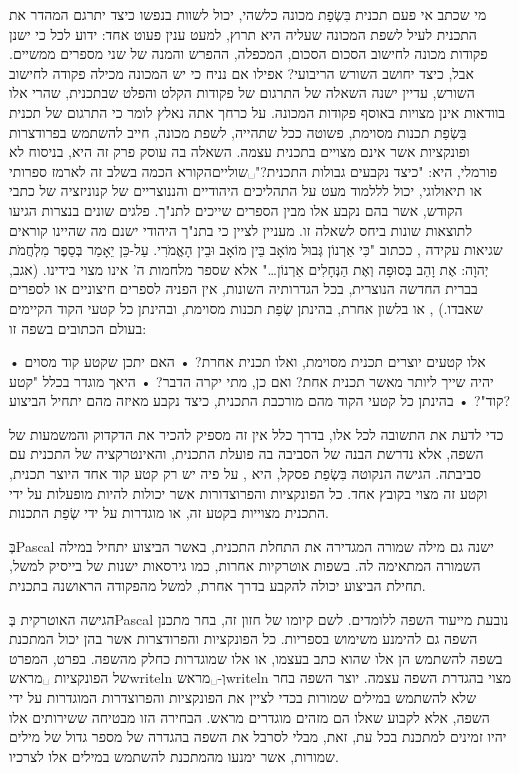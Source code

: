 מי שכתב אי פעם תכנית בִּשְׂפַת מכונה כלשהי, יכול לשוות בנפשו כיצד יתרגם המהדר את התכנית לעיל לשפת המכונה שעליה היא תרוץ, למעט ענין פעוט אחד: ידוע לכל כי ישנן פקודות מכונה לחישוב הסכום הסכום, המכפלה, ההפרש והמנה של שני מספרים ממשיים. אבל, כיצד יחושב השורש הריבועי? אפילו אם נניח כי יש המכונה מכילה פקודה לחישוב השורש, עדיין ישנה השאלה של התרגום של פקודות הקלט והפלט שבתכנית, שהרי אלו בוודאות אינן מצויות באוסף פקודות המכונה.
על כרחך אתה נאלץ לומר כי התרגום של תכנית בִּשְׂפַת תכנות מסוימת, פשוטה ככל שתהייה, לשפת מכונה, חייב להשתמש בפרודצרות ופונקציות אשר אינם מצויים בתכנית עצמה. השאלה בה עוסק פרק זה היא, בניסוח לא פורמלי, היא: "כיצד נקבעים גבולות התכנית?"␣שוליים{הקורא הכמה בשלב זה לארמז ספרותי או תיאולוגי, יכול לללמוד מעט על התהליכים היהודיים והננוצריים של קנוניזציה של כתבי הקודש, אשר בהם נקבע אלו מבין הספרים שייכים לתנ"ך. פלגים שונים בנצרות הגיעו לתוצאות שונות ביחס לשאלה זו. מעניין לציין כי בתנ"ך היהודי ישנם מה שהיינו קוראים שגיאות עקידה , ככתוב "כִּי אַרְנוֹן גְּבוּל מוֹאָב בֵּין מוֹאָב וּבֵין הָאֱמֹרִי. עַל-כֵּן יֵאָמַר בְּסֵפֶר מִלְחֲמֹת יְהוָה: אֶת וָהֵב בְּסוּפָה וְאֶת הַנְּחָלִים אַרְנוֹן…" אלא שספר מלחמות ה' אינו מצוי בידינו. (אגב, בברית החדשה הנוצרית, בכל הגדרותיה השונות, אין הפניה לספרים חיצוניים או לספרים שאבדו.)
}, או בלשון אחרת, בהינתן שְׂפַת תכנות מסוימת, ובהינתן כל קטעי הקוד הקיימים בעולם הכתובים בשפה זו:
\begin{itemize}
• אלו קטעים יוצרים תכנית מסוימת, ואלו תכנית אחרת?
• האם יתכן שקטע קוד מסוים יהיה שייך ליותר מאשר תכנית אחת? ואם כן, מתי יקרה הדבר?
• היאך מוגדר בכלל "קטע קוד"?
• בהינתן כל קטעי הקוד מהם מורכבת התכנית, כיצד נקבע מאיזה מהם יתחיל הביצוע?
\end{itemize}
כדי לדעת את התשובה לכל אלו, בדרך כלל אין זה מספיק להכיר את הדקדוק והמשמעות של השפה, אלא נדרשת הבנה של הסביבה בה פועלת התכנית, והאינטרקציה של התכנית עם סביבתה.
הגישה הנקוטה בִּשְׂפַת פסקל, היא , על פיה יש רק קטע קוד אחד היוצר תכנית, וקטע זה מצוי בקובץ אחד. כל הפונקציות והפרוצדורות אשר יכולות להיות מופעלות על ידי התכנית מצוייות בקטע זה, או מוגדרות על ידי שְׂפַת התכנות.

בְּPascal ישנה גם מילה שמורה  המגדירה את התחלת התכנית, באשר הביצוע יתחיל במילה השמורה  המתאימה לה. בשפות אוטרקיות אחרות, כמו גירסאות ישנות של בייסיק למשל, תחילת הביצוע יכולה להקבע בדרך אחרת, למשל מהפקודה הראושנה בתכנית.

הגישה האוטרקית בְּPascal נובעת מייעוד השפה ללומדים. לשם קיומו של חזון זה, בחר מתכנן השפה גם להימנע משימוש בספריות. כל הפונקציות והפרודצרות אשר בהן יכול המתכנת בשפה להשתמש הן אלו שהוא כתב בעצמו, או אלו שמוגדרות כחלק מהשפה. בפרט, המפרט של הפונקציות ␣מראש{writeln} וְ-␣מראש{writeln} מצוי בהגדרת השפה עצמה. יוצר השפה בחר שלא להשתמש במילים שמורות בכדי לציין את הפונקציות והפרוצדרות המוגדרות על ידי השפה, אלא לקבוע שאלו הם מזהים מוגדרים מראש. הבחירה הזו מבטיחה ששירותים אלו יהיו זמינים למתכנת בכל עת, זאת, מבלי לסרבל את השפה בהגדרה של מספר גדול של מילים שמורות, אשר ימנעו מהמתכנת להשתמש במילים אלו לצרכיו.

